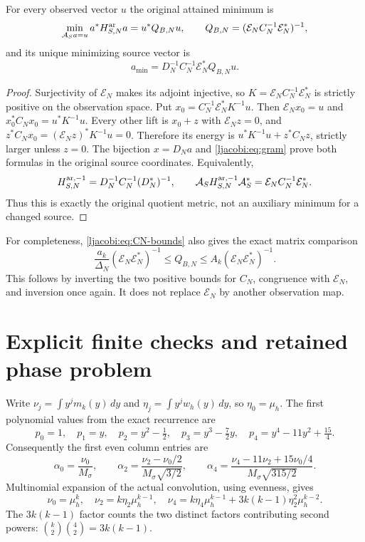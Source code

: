\begin{ljacobitheorem}\label{ljacobi:thm:quotient}
For every observed vector $u$ the original attained minimum is
\begin{equation}\label{ljacobi:eq:quotient}
 \min_{\mathcal A_Sa=u}a^*H_{S,N}^{\rm ar}a
  =u^*Q_{B,N}u,\qquad
 Q_{B,N}=(\mathcal E_NC_N^{-1}\mathcal E_N^*)^{-1},
\end{equation}
and its unique minimizing source vector is
\begin{equation}\label{ljacobi:eq:lift}
 a_{\min}=D_N^{-1}C_N^{-1}\mathcal E_N^*Q_{B,N}u.
\end{equation}
\end{ljacobitheorem}
\begin{proof}
Surjectivity of $\mathcal E_N$ makes its adjoint injective, so
$K=\mathcal E_NC_N^{-1}\mathcal E_N^*$ is strictly positive on the
observation space. Put $x_0=C_N^{-1}\mathcal E_N^*K^{-1}u$.
Then $\mathcal E_Nx_0=u$ and
$x_0^*C_Nx_0=u^*K^{-1}u$. Every other lift is $x_0+z$ with
$\mathcal E_Nz=0$, and
$z^*C_Nx_0=(\mathcal E_Nz)^*K^{-1}u=0$. Therefore its energy is
$u^*K^{-1}u+z^*C_Nz$, strictly larger unless $z=0$.
The bijection $x=D_Na$ and \eqref{ljacobi:eq:gram} prove both formulas in
the original source coordinates. Equivalently,
\[
 H_{S,N}^{{\rm ar},-1}=D_N^{-1}C_N^{-1}(D_N^*)^{-1},\qquad
 \mathcal A_SH_{S,N}^{{\rm ar},-1}\mathcal A_S^*
                   =\mathcal E_NC_N^{-1}\mathcal E_N^*.
\]
Thus this is exactly the original quotient metric, not an auxiliary
minimum for a changed source.
\end{proof}

For completeness, \eqref{ljacobi:eq:CN-bounds} also gives the exact matrix
comparison
\[
 \frac{a_k}{\Delta_N}(\mathcal E_N\mathcal E_N^*)^{-1}
       \leq Q_{B,N}\leq
 A_k(\mathcal E_N\mathcal E_N^*)^{-1}.
\]
This follows by inverting the two positive bounds for $C_N$,
congruence with $\mathcal E_N$, and inversion once again. It does
not replace $\mathcal E_N$ by another observation map.

\section{Explicit finite checks and retained phase problem}

Write $\nu_j=\int y^jm_k(y)\,dy$ and
$\eta_j=\int y^jw_h(y)\,dy$, so $\eta_0=\mu_h$.
The first polynomial values from the exact recurrence are
\[
 p_0=1,\quad p_1=y,\quad p_2=y^2-\tfrac12,\quad
 p_3=y^3-\tfrac72y,\quad p_4=y^4-11y^2+\tfrac{15}4.
\]
Consequently the first even column entries are
\[
 \alpha_0=\frac{\nu_0}{M_\sigma},\qquad
 \alpha_2=\frac{\nu_2-\nu_0/2}{M_\sigma\sqrt{3/2}},\qquad
 \alpha_4=\frac{\nu_4-11\nu_2+15\nu_0/4}
                   {M_\sigma\sqrt{315/2}}.
\]
Multinomial expansion of the actual convolution, using evenness,
gives
\[
 \nu_0=\mu_h^k,\quad \nu_2=k\eta_2\mu_h^{k-1},\quad
 \nu_4=k\eta_4\mu_h^{k-1}
              +3k(k-1)\eta_2^2\mu_h^{k-2}.
\]
The $3k(k-1)$ factor counts the two distinct factors contributing
second powers: $\binom{k}{2}\binom42=3k(k-1)$.

